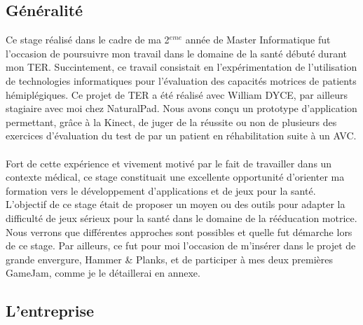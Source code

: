 \subsection{Généralité}	
Ce stage réalisé dans le cadre de ma 2$^{eme}$ année de Master Informatique fut l'occasion de poursuivre mon travail dans le domaine de la santé débuté durant mon TER. Succintement, ce travail consistait en l'expérimentation de l'utilisation de technologies informatiques pour l'évaluation des capacités motrices de patients hémiplégiques. Ce projet de TER a été réalisé avec William DYCE, par ailleurs stagiaire avec moi chez NaturalPad. Nous avons conçu un prototype d'application permettant, grâce à la Kinect, de juger de la réussite ou non de plusieurs des exercices d'évaluation du test de %
par un patient en réhabilitation suite à un AVC. \paragraph{}
Fort de cette expérience et vivement motivé par le fait de travailler dans un contexte médical, ce stage constituait une excellente opportunité d'orienter ma formation vers le développement d'applications et de jeux pour la santé.\\
L'objectif de ce stage était de proposer un moyen ou des outils pour adapter la difficulté de jeux sérieux pour la santé dans le domaine de la rééducation motrice. Nous verrons que différentes approches sont possibles et quelle fut démarche lors de ce stage. Par ailleurs, ce fut pour moi l'occasion de m'insérer dans le projet de grande envergure, Hammer \& Planks, et de participer à mes deux premières GameJam, comme je le détaillerai en annexe.

\subsection{L'entreprise}
